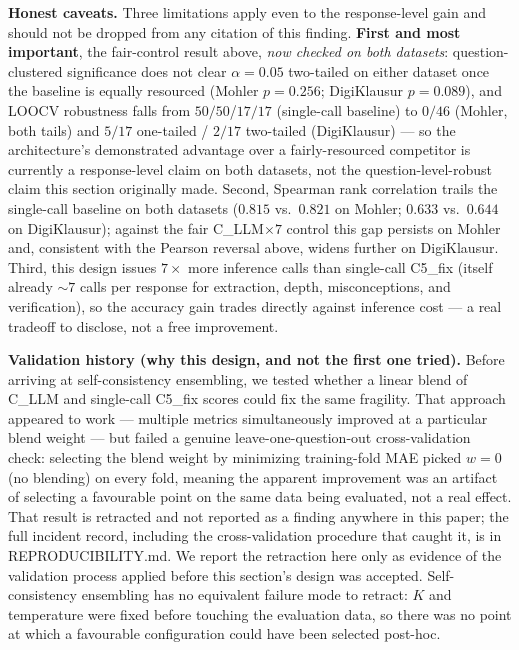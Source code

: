 \documentclass[conference]{IEEEtran}
\begin{document}
\textbf{Honest caveats.} Three limitations apply even to the response-level
gain and should not be dropped from any citation of this finding.
\textbf{First and most important}, the fair-control result above,
\emph{now checked on both datasets}: question-clustered significance
does not clear $\alpha=0.05$ two-tailed on either dataset once the
baseline is equally resourced (Mohler $p=0.256$; DigiKlausur $p=0.089$),
and LOOCV robustness falls from $50/50$/$17/17$ (single-call baseline)
to $0/46$ (Mohler, both tails) and $5/17$ one-tailed / $2/17$ two-tailed
(DigiKlausur) --- so the architecture's demonstrated advantage over a
fairly-resourced competitor is currently a response-level claim on both
datasets, not the question-level-robust claim this section originally
made. Second, Spearman rank correlation trails the single-call baseline
on both datasets ($0.815$ vs.\ $0.821$ on Mohler; $0.633$ vs.\ $0.644$
on DigiKlausur); against the fair C\_LLM$\times7$ control this gap
persists on Mohler and, consistent with the Pearson reversal above,
widens further on DigiKlausur. Third, this design issues $7\times$ more inference
calls than single-call C5\_fix (itself already $\sim\!7$ calls per
response for extraction, depth, misconceptions, and verification), so
the accuracy gain trades directly against inference cost --- a real
tradeoff to disclose, not a free improvement.

\textbf{Validation history (why this design, and not the first one
tried).} Before arriving at self-consistency ensembling, we tested
whether a linear blend of C\_LLM and single-call C5\_fix scores could
fix the same fragility. That approach appeared to work --- multiple
metrics simultaneously improved at a particular blend weight --- but
failed a genuine leave-one-question-out cross-validation check: selecting
the blend weight by minimizing training-fold MAE picked $w=0$ (no
blending) on every fold, meaning the apparent improvement was an
artifact of selecting a favourable point on the same data being
evaluated, not a real effect. That result is retracted and not reported
as a finding anywhere in this paper; the full incident record, including
the cross-validation procedure that caught it, is in REPRODUCIBILITY.md.
We report the retraction here only as evidence of the validation process
applied before this section's design was accepted. Self-consistency
ensembling has no equivalent
failure mode to retract: $K$ and temperature were fixed before touching
the evaluation data, so there was no point at which a favourable
configuration could have been selected post-hoc.
\end{document}
